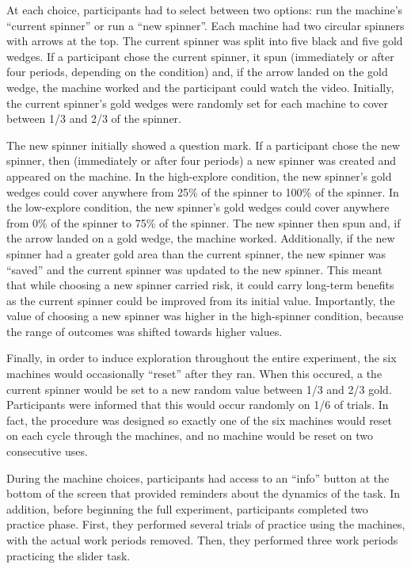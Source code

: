 \documentclass[10pt,letterpaper]{article}
\begin{document}
At each choice, participants had to select between two options: run the
machine's ``current spinner'' or run a ``new spinner''. Each machine had two
circular spinners with arrows at the top. The current spinner was split into
five black and five gold wedges. If a participant chose the
current spinner, it spun (immediately or after four periods, depending
on the condition) and, if the arrow landed on the gold wedge, the machine
worked and the participant could watch the video. Initially, the
current spinner's gold wedges were randomly set for each machine to cover between
1/3 and 2/3 of the spinner.

The new spinner initially showed a question mark. If a participant chose the
new spinner, then (immediately or after four periods) a new spinner was
created and appeared on the machine. In the high-explore condition, the new spinner's gold wedges could cover
anywhere from 25\% of the spinner to 100\% of the spinner. In the low-explore condition, the new spinner's gold wedges could cover
anywhere from 0\% of the spinner to 75\% of the spinner. The new spinner then
spun and, if the arrow landed on a gold wedge, the machine worked.
Additionally, if the new spinner had a greater gold area than the current
spinner, the new spinner was ``saved'' and the current spinner was
updated to the new spinner.  This meant that
while choosing a new spinner carried risk, it could carry long-term
benefits as the current spinner could be improved from its initial value.
Importantly, the value of choosing a new spinner was higher in the high-spinner
condition, because the range of outcomes was shifted towards higher values.

Finally, in order to induce exploration throughout the entire experiment, the
six machines would occasionally ``reset'' after they ran. When this occured, a
the current spinner would be set to a new random value between 1/3 and 2/3 gold.
Participants were informed that this would occur randomly on
1/6 of trials. In fact, the procedure was designed so exactly one of the six
machines would reset on each cycle through the machines, and no machine would be
reset on two consecutive uses.

During the machine choices, participants had access to an ``info'' button at the
bottom of the screen that provided reminders about the dynamics of the task. In
addition, before beginning the full experiment, participants completed two
practice phase. First, they performed several trials of practice using the
machines, with the actual work periods removed. Then, they performed three work
periods practicing the slider task.
\end{document}
